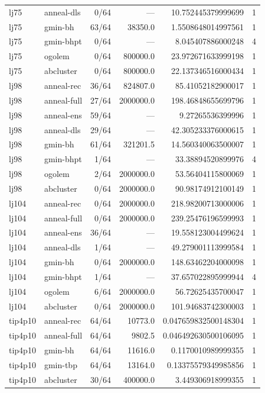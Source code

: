 \begin{longtable}{llrrrr}
lj75 & anneal-dls & 0/64 & --- & 10.752445379999699 & 1\\
lj75 & gmin-bh & 63/64 & 38350.0 & 1.5508648014997561 & 1\\
lj75 & gmin-bhpt & 0/64 & --- & 8.045407886000248 & 4\\
lj75 & ogolem & 0/64 & 800000.0 & 23.972671633999198 & 1\\
lj75 & abcluster & 0/64 & 800000.0 & 22.137346516000434 & 1\\
lj98 & anneal-rec & 36/64 & 824807.0 & 85.41052182900017 & 1\\
lj98 & anneal-full & 27/64 & 2000000.0 & 198.46848655699796 & 1\\
lj98 & anneal-ens & 59/64 & --- & 9.27265536399996 & 1\\
lj98 & anneal-dls & 29/64 & --- & 42.305233376000615 & 1\\
lj98 & gmin-bh & 61/64 & 321201.5 & 14.560340063500007 & 1\\
lj98 & gmin-bhpt & 1/64 & --- & 33.38894520899976 & 4\\
lj98 & ogolem & 2/64 & 2000000.0 & 53.56404115800069 & 1\\
lj98 & abcluster & 0/64 & 2000000.0 & 90.98174912100149 & 1\\
lj104 & anneal-rec & 0/64 & 2000000.0 & 218.98200713000006 & 1\\
lj104 & anneal-full & 0/64 & 2000000.0 & 239.25476196599993 & 1\\
lj104 & anneal-ens & 36/64 & --- & 19.558123004499624 & 1\\
lj104 & anneal-dls & 1/64 & --- & 49.279001113999584 & 1\\
lj104 & gmin-bh & 0/64 & 2000000.0 & 148.63462204000098 & 1\\
lj104 & gmin-bhpt & 1/64 & --- & 37.657022895999944 & 4\\
lj104 & ogolem & 6/64 & 2000000.0 & 56.72625435700047 & 1\\
lj104 & abcluster & 0/64 & 2000000.0 & 101.94683742300003 & 1\\
tip4p10 & anneal-rec & 64/64 & 10773.0 & 0.047659832500148304 & 1\\
tip4p10 & anneal-full & 64/64 & 9802.5 & 0.046492630500106095 & 1\\
tip4p10 & gmin-bh & 64/64 & 11616.0 & 0.1170010989999355 & 1\\
tip4p10 & gmin-tbp & 64/64 & 13164.0 & 0.13375579349985856 & 1\\
tip4p10 & abcluster & 30/64 & 400000.0 & 3.449306918999355 & 1\\

\end{longtable}
